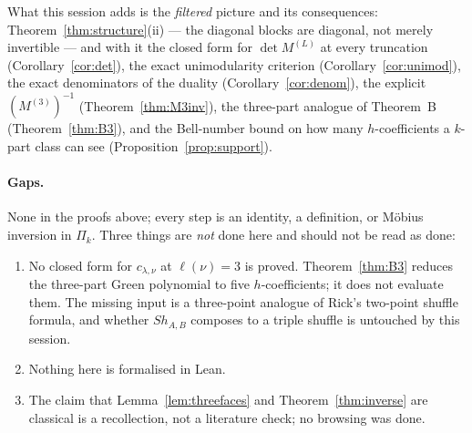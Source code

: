 \documentclass[11pt]{article}
\theoremstyle{definition}
\newcommand{\lam}{\lambda}
\begin{document}
What this session adds is the \emph{filtered} picture and its consequences:
Theorem~\ref{thm:structure}(ii) --- the diagonal blocks are diagonal, not merely invertible ---
and with it the closed form for $\det M^{(L)}$ at every truncation
(Corollary~\ref{cor:det}), the exact unimodularity criterion (Corollary~\ref{cor:unimod}), the exact
denominators of the duality (Corollary~\ref{cor:denom}), the explicit $(M^{(3)})^{-1}$
(Theorem~\ref{thm:M3inv}), the three-part analogue of Theorem~B (Theorem~\ref{thm:B3}), and the
Bell-number bound on how many $h$-coefficients a $k$-part class can see
(Proposition~\ref{prop:support}).

\paragraph{Gaps.} None in the proofs above; every step is an identity, a definition, or Möbius
inversion in $\Pi_k$. Three things are \emph{not} done here and should not be read as done:
\begin{enumerate}
\item No closed form for $c_{\lam,\nu}$ at $\ell(\nu)=3$ is proved. Theorem~\ref{thm:B3} reduces the
three-part Green polynomial to five $h$-coefficients; it does not evaluate them. The missing input is
a three-point analogue of Rick's two-point shuffle formula, and whether $Sh_{A,B}$ composes to a
triple shuffle is untouched by this session.
\item Nothing here is formalised in Lean.
\item The claim that Lemma~\ref{lem:threefaces} and Theorem~\ref{thm:inverse} are classical is a
recollection, not a literature check; no browsing was done.
\end{enumerate}
\end{document}
